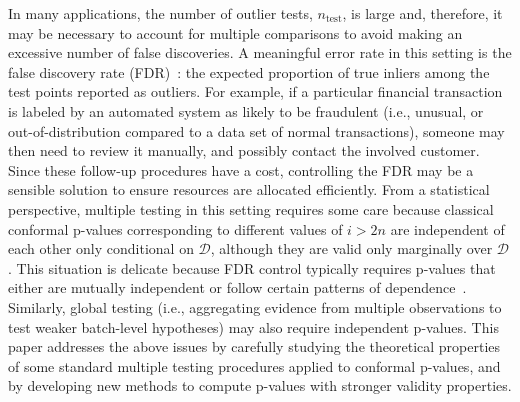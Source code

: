 In many applications, the number of outlier tests, $n_{\text{test}}$, is large and, therefore, it may be necessary to account for multiple comparisons to avoid making an excessive number of false discoveries.
A meaningful error rate in this setting is the false discovery rate (FDR)~\cite{benjamini1995controlling}: the expected proportion of true inliers among the test points reported as outliers. For example, if a particular financial transaction is labeled by an automated system as likely to be fraudulent (i.e., unusual, or out-of-distribution compared to a data set of normal transactions), someone may then need to review it manually, and possibly contact the involved customer.
Since these follow-up procedures have a cost, controlling the FDR may be a sensible solution to ensure resources are allocated efficiently.
From a statistical perspective, multiple testing in this setting requires some care because classical conformal p-values corresponding to different values of $i>2n$ are independent of each other only conditional on $\mathcal{D}$, although they are valid only marginally over $\mathcal{D}$.
This situation is delicate because FDR control typically requires p-values that either are mutually independent or follow certain patterns of dependence~\cite{benjamini2001control, clarke2009robustness}.
Similarly, global testing (i.e., aggregating evidence from multiple observations to test weaker batch-level hypotheses) may also require independent p-values.
This paper addresses the above issues by carefully studying the theoretical properties of some standard multiple testing procedures applied to conformal p-values, and by developing new methods to compute p-values with stronger validity properties.

